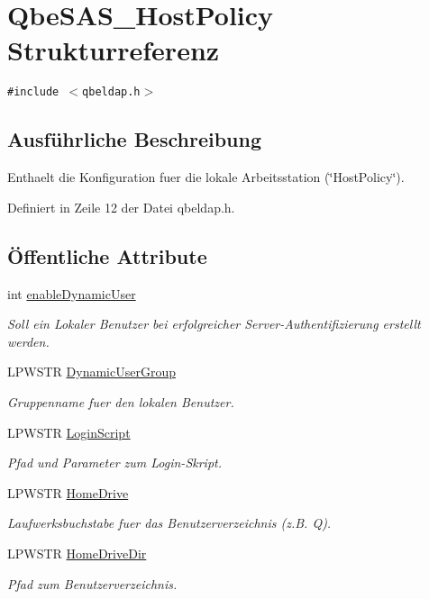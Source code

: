 \hypertarget{structQbeSAS__HostPolicy}{
\section{Qbe\-SAS\_\-Host\-Policy Strukturreferenz}
\label{structQbeSAS__HostPolicy}
}
{\tt \#include $<$qbeldap.h$>$}



\subsection{Ausf\"{u}hrliche Beschreibung}
Enthaelt die Konfiguration fuer die lokale Arbeitsstation (\char`\"{}Host\-Policy\char`\"{}). 



Definiert in Zeile 12 der Datei qbeldap.h.\subsection*{\"{O}ffentliche Attribute}
\begin{CompactItemize}
\item 
int \hyperlink{structQbeSAS__HostPolicy_QbeSAS__HostPolicyo0}{enable\-Dynamic\-User}
\begin{CompactList}\small\item\em Soll ein Lokaler Benutzer bei erfolgreicher Server-Authentifizierung erstellt werden. \item\end{CompactList}\item 
LPWSTR \hyperlink{structQbeSAS__HostPolicy_QbeSAS__HostPolicyo1}{Dynamic\-User\-Group}
\begin{CompactList}\small\item\em Gruppenname fuer den lokalen Benutzer. \item\end{CompactList}\item 
LPWSTR \hyperlink{structQbeSAS__HostPolicy_QbeSAS__HostPolicyo2}{Login\-Script}
\begin{CompactList}\small\item\em Pfad und Parameter zum Login-Skript. \item\end{CompactList}\item 
LPWSTR \hyperlink{structQbeSAS__HostPolicy_QbeSAS__HostPolicyo3}{Home\-Drive}
\begin{CompactList}\small\item\em Laufwerksbuchstabe fuer das Benutzerverzeichnis (z.B. Q). \item\end{CompactList}\item 
LPWSTR \hyperlink{structQbeSAS__HostPolicy_QbeSAS__HostPolicyo4}{Home\-Drive\-Dir}
\begin{CompactList}\small\item\em Pfad zum Benutzerverzeichnis. \item\end{CompactList}\end{CompactItemize}


